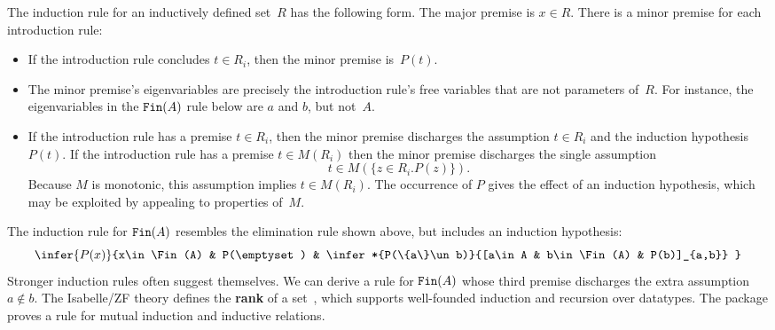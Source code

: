 The induction rule for an inductively defined set~$R$ has the following form.
The major premise is $x\in R$.  There is a minor premise for each
introduction rule:
\begin{itemize}
\item If the introduction rule concludes $t\in R_i$, then the minor premise
is~$P(t)$.

\item The minor premise's eigenvariables are precisely the introduction
rule's free variables that are not parameters of~$R$.  For instance, the
eigenvariables in the $\hbox{\tt Fin}(A)$ rule below are $a$ and $b$, but not~$A$.

\item If the introduction rule has a premise $t\in R_i$, then the minor
premise discharges the assumption $t\in R_i$ and the induction
hypothesis~$P(t)$.  If the introduction rule has a premise $t\in M(R_i)$
then the minor premise discharges the single assumption
\[ t\in M(\{z\in R_i. P(z)\}). \] 
Because $M$ is monotonic, this assumption implies $t\in M(R_i)$.  The
occurrence of $P$ gives the effect of an induction hypothesis, which may be
exploited by appealing to properties of~$M$.
\end{itemize}
The induction rule for $\hbox{\tt Fin}(A)$ resembles the elimination rule shown above,
but includes an induction hypothesis:
\[ \infer{P(x)}{x\in\Fin(A) & P(\emptyset)
        & \infer*{P(\{a\}\un b)}{[a\in A & b\in\Fin(A) & P(b)]_{a,b}} }
\] 
Stronger induction rules often suggest themselves.  We can derive a rule
for $\hbox{\tt Fin}(A)$ whose third premise discharges the extra assumption $a\not\in
b$.  The Isabelle/ZF theory defines the {\bf rank} of a
set~\cite[\S3.4]{paulson-set-II}, which supports well-founded induction and
recursion over datatypes.  The package proves a rule for mutual induction
and inductive relations.

